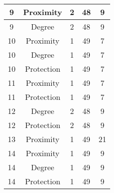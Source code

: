 \documentclass[results.tex]{subfiles}
\begin{document}
\begin{center}
\begin{tabular}{| c || c | c | c | c |}
            \hline
            9                       & Proximity                    & 2                      & 48                      & 9                    \\
            \hline
            9                       & Degree                       & 2                      & 48                      & 9                    \\
            \hline
            10                      & Proximity                    & 1                      & 49                      & 7                    \\
            \hline
            10                      & Degree                       & 1                      & 49                      & 7                    \\
            \hline
            10                      & Protection                   & 1                      & 49                      & 7                    \\
            \hline
            11                      & Proximity                    & 1                      & 49                      & 7                    \\
            \hline
            11                      & Protection                   & 1                      & 49                      & 7                    \\
            \hline
            12                      & Degree                       & 2                      & 48                      & 9                    \\
            \hline
            12                      & Protection                   & 2                      & 48                      & 9                    \\
            \hline
            13                      & Proximity                    & 1                      & 49                      & 21                   \\
            \hline
            14                      & Proximity                    & 1                      & 49                      & 9                    \\
            \hline
            14                      & Degree                       & 1                      & 49                      & 9                    \\
            \hline
            14                      & Protection                   & 1                      & 49                      & 9                    \\

\end{tabular}
\end{center}
\end{document}
